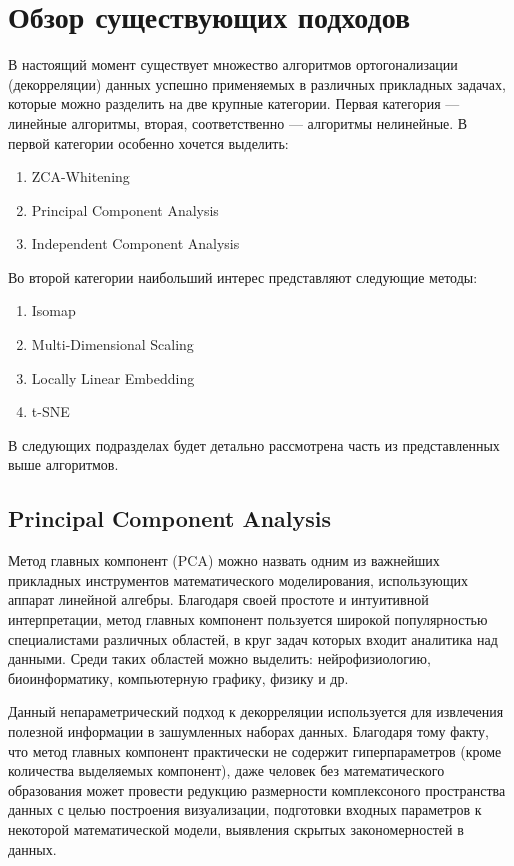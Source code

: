 \documentclass[runningheads]{llncs}
\begin{document}
\section*{Обзор существующих подходов}

В настоящий момент существует множество алгоритмов ортогонализации (декорреляции) данных успешно применяемых в различных прикладных задачах, которые можно разделить на две крупные категории. Первая категория — линейные алгоритмы, вторая, соответственно — алгоритмы нелинейные. В первой категории особенно хочется выделить:
\begin{enumerate}
  \item ZCA-Whitening
  \item Principal Component Analysis
  \item Independent Component Analysis \cite{fastica}
\end{enumerate}
Во второй категории наибольший интерес представляют следующие методы:
\begin{enumerate}
  \item Isomap \cite{isomap}
  \item Multi-Dimensional Scaling \cite{mds}
  \item Locally Linear Embedding \cite{locallyle}
  \item t-SNE  \cite{tsne}
\end{enumerate}
В следующих подразделах будет детально рассмотрена часть из представленных выше алгоритмов.
\subsection{Principal Component Analysis}
\hspace{0.4cm}
Метод главных компонент (PCA) можно назвать одним из важнейших прикладных инструментов математического моделирования, использующих аппарат линейной алгебры. Благодаря своей простоте и интуитивной интерпретации, метод главных компонент пользуется широкой популярностью специалистами различных областей, в круг задач которых входит аналитика над данными. Среди таких областей можно выделить: нейрофизиологию, биоинформатику, компьютерную графику, физику и др. \par
Данный непараметрический подход к декорреляции используется для извлечения полезной информации в зашумленных наборах данных. Благодаря тому факту, что метод главных компонент практически не содержит гиперпараметров (кроме количества выделяемых компонент), даже человек без математического образования может провести редукцию размерности комплексоного пространства данных с целью построения визуализации, подготовки входных параметров к некоторой математической модели, выявления скрытых закономерностей в данных.
\end{document}
